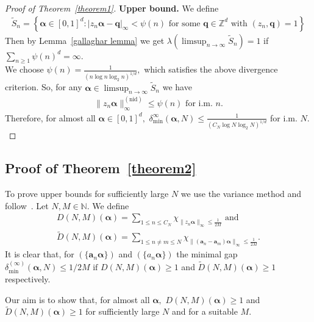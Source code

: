 \documentclass[12pt,article]{amsart}
\theoremstyle{remark}
\numberwithin{equation}{section}
\newcommand{\Z}{\mathbb{Z}}
\newcommand{\N}{\mathbb{N}}
\newcommand{\boldq}{\boldsymbol{q}}
\newcommand{\bolda}{\boldsymbol{a}}
\newcommand{\boldalpha}{\boldsymbol{\alpha}}
\begin{document}
\begin{proof}[Proof of Theorem~\ref{theorem1}]
		
		\textbf{Upper bound.}
		We define 
		\begin{align*}
			\tilde{S}_n=\left\{\boldalpha\in[0,1]^d:|z_n\boldalpha-\boldq|_{\infty}<\psi(n)\text{ for some }\boldq\in\Z^d \text{ with }(z_n,\boldq)=1\right\}
		\end{align*}
		Then by Lemma~\ref{gallaghar lemma} we get $\lambda(\limsup_{n\to\infty}\tilde{S}_n)=1$ if $\sum_{n\geq 1}\psi(n)^d=\infty.$\\
		We choose $\psi(n)=\frac{1}{(n\log n\log_2 n)^{1/d}},$ which satisfies the above divergence criterion. So,
		for any $\boldalpha\in\limsup_{n\to\infty} \tilde{S}_n$ we have 
		\begin{align*}
			\|z_n\boldalpha\|_{\infty}^{(\text{nid})}\leq \psi(n) \text{ for i.m. }n.	
		\end{align*}
		Therefore, for almost all $\boldalpha\in[0,1]^d,$ $\delta_{\text{min}}^\infty(\boldalpha,N)\leq\frac{1}{(C_N\log N\log_2 N)^{1/d}}$ for i.m. $N.$
	\end{proof}

	\subsection{Proof of Theorem~\ref{theorem2}}
	To prove upper bounds for sufficiently large $N$ we use the variance method and follow~\cite{Rudnick2018minimalgap}. 
	Let $N, M\in\N.$ We define 
	\begin{align*}
		D(N,M)(\boldalpha)=\sum_{1\leq n\leq C_N}\chi_{\|z_n\boldalpha\|_\infty\leq\frac{1}{2M}}\text{ and}\\
		\widetilde{D}(N,M)(\boldalpha)=\sum_{1\leq n\neq m \leq N}\chi_{\|(\bolda_n-\bolda_m)\boldalpha\|_\infty\leq\frac{1}{2M}}.
	\end{align*}
	It is clear that, for $(\{\bolda_n\boldalpha\})$ and $(\{a_n\boldalpha\})$ the minimal gap $\delta_{\text{min}}^{(\infty)}(\boldalpha,N)\leq 1/2M\text{ if } D(N,M)(\boldalpha)\geq 1$ and $\widetilde{D}(N,M)(\boldalpha)\geq 1$ respectively.
	
	Our aim is to show that, for almost all $\boldalpha,$  $D(N,M)(\boldalpha)\geq 1$ and $\widetilde{D}(N,M)(\boldalpha)\geq 1$ for sufficiently large $N$ and for a suitable $M.$ 
	
\end{document}
